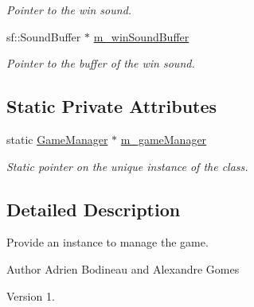 \begin{DoxyCompactItemize}
\begin{DoxyCompactList}\small\item\em Pointer to the win sound. \end{DoxyCompactList}\item 
\hypertarget{class_game_manager_ab7e281ae47b37721117c0ddf7f9f36e0}{sf\-::\-Sound\-Buffer $\ast$ \hyperlink{class_game_manager_ab7e281ae47b37721117c0ddf7f9f36e0}{m\-\_\-win\-Sound\-Buffer}}\label{class_game_manager_ab7e281ae47b37721117c0ddf7f9f36e0}

\begin{DoxyCompactList}\small\item\em Pointer to the buffer of the win sound. \end{DoxyCompactList}\end{DoxyCompactItemize}
\subsection*{Static Private Attributes}
\begin{DoxyCompactItemize}
\item 
\hypertarget{class_game_manager_a2bf6eac738e0ba23fa7a1d4273954c79}{static \hyperlink{class_game_manager}{Game\-Manager} $\ast$ \hyperlink{class_game_manager_a2bf6eac738e0ba23fa7a1d4273954c79}{m\-\_\-game\-Manager}}\label{class_game_manager_a2bf6eac738e0ba23fa7a1d4273954c79}

\begin{DoxyCompactList}\small\item\em Static pointer on the unique instance of the class. \end{DoxyCompactList}\end{DoxyCompactItemize}


\subsection{Detailed Description}
Provide an instance to manage the game. 

\begin{DoxyAuthor}{Author}
Adrien Bodineau and Alexandre Gomes 
\end{DoxyAuthor}
\begin{DoxyVersion}{Version}
1. 
\end{DoxyVersion}


